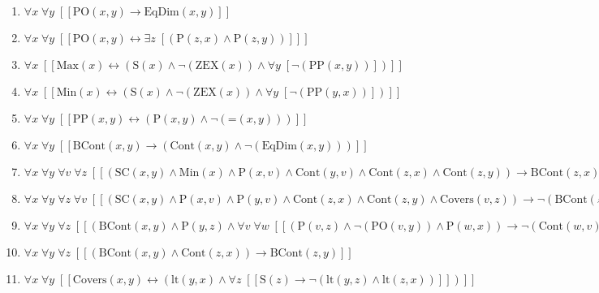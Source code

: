 \documentclass{article}
\begin{document}
\begin{enumerate}
\item $\forall x\; \forall y\;  \left[ \left[ \textrm{PO}(x,y) \rightarrow \textrm{EqDim}(x,y) \right] \right]$
\item $\forall x\; \forall y\;  \left[ \left[ \textrm{PO}(x,y) \leftrightarrow \exists z\;  \left[ \left(\textrm{P}(z,x) \land \textrm{P}(z,y)\right) \right] \right] \right]$
\item $\forall x\;  \left[ \left[ \textrm{Max}(x) \leftrightarrow \left(\textrm{S}(x) \land \neg \left(\textrm{ZEX}(x)\right) \land \forall y\;  \left[ \neg \left(\textrm{PP}(x,y)\right) \right]\right) \right] \right]$
\item $\forall x\;  \left[ \left[ \textrm{Min}(x) \leftrightarrow \left(\textrm{S}(x) \land \neg \left(\textrm{ZEX}(x)\right) \land \forall y\;  \left[ \neg \left(\textrm{PP}(y,x)\right) \right]\right) \right] \right]$
\item $\forall x\; \forall y\;  \left[ \left[ \textrm{PP}(x,y) \leftrightarrow \left(\textrm{P}(x,y) \land \neg \left(\textrm{=}(x,y)\right)\right) \right] \right]$
\item $\forall x\; \forall y\;  \left[ \left[ \textrm{BCont}(x,y) \rightarrow \left(\textrm{Cont}(x,y) \land \neg \left(\textrm{EqDim}(x,y)\right)\right) \right] \right]$
\item $\forall x\; \forall y\; \forall v\; \forall z\;  \left[ \left[ \left(\textrm{SC}(x,y) \land \textrm{Min}(x) \land \textrm{P}(x,v) \land \textrm{Cont}(y,v) \land \textrm{Cont}(z,x) \land \textrm{Cont}(z,y)\right) \rightarrow \textrm{BCont}(z,x) \right] \right]$
\item $\forall x\; \forall y\; \forall z\; \forall v\;  \left[ \left[ \left(\textrm{SC}(x,y) \land \textrm{P}(x,v) \land \textrm{P}(y,v) \land \textrm{Cont}(z,x) \land \textrm{Cont}(z,y) \land \textrm{Covers}(v,z)\right) \rightarrow \neg \left(\textrm{BCont}(z,v)\right) \right] \right]$
\item $\forall x\; \forall y\; \forall z\;  \left[ \left[ \left(\textrm{BCont}(x,y) \land \textrm{P}(y,z) \land \forall v\; \forall w\;  \left[ \left[ \left(\textrm{P}(v,z) \land \neg \left(\textrm{PO}(v,y)\right) \land \textrm{P}(w,x)\right) \rightarrow \neg \left(\textrm{Cont}(w,v)\right) \right] \right]\right) \rightarrow \textrm{BCont}(x,z) \right] \right]$
\item $\forall x\; \forall y\; \forall z\;  \left[ \left[ \left(\textrm{BCont}(x,y) \land \textrm{Cont}(z,x)\right) \rightarrow \textrm{BCont}(z,y) \right] \right]$
\item $\forall x\; \forall y\;  \left[ \left[ \textrm{Covers}(x,y) \leftrightarrow \left(\textrm{lt}(y,x) \land \forall z\;  \left[ \left[ \textrm{S}(z) \rightarrow \neg \left(\textrm{lt}(y,z) \land \textrm{lt}(z,x)\right) \right] \right]\right) \right] \right]$

\end{enumerate}
\end{document}
